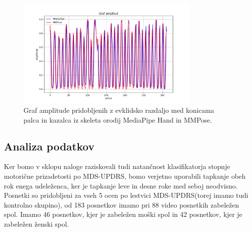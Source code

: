 \documentclass[a4paper,12pt]{article}  %
\begin{document}
\begin{figure}[H]
  \centering
  \includegraphics[width=0.8\textwidth]{slike/distances_plot_both.png}  
  \caption{Graf amplitude pridobljenih z evklidsko razdaljo med konicama palca in kazalca iz skeleta orodij MediaPipe Hand in MMPose.}
  \label{fig:amplituda_oba}
\end{figure}


\subsection{Analiza podatkov}

Ker bomo v sklopu naloge raziskovali tudi natančnost klasifikatorja stopnje motorične prizadetosti po MDS-UPDRS, 
bomo verjetno uporabili tapkanje obeh rok enega udeleženca, ker je tapkanje leve in desne roke med seboj neodvisno.\\

Posnetki so pridobljeni za vseh 5 ocen po lestvici MDS-UPDRS(torej imamo tudi kontrolno skupino), od 183 posnetkov 
imamo pri 88 video posnetkih zabeležen spol. Imamo 46 posnetkov, kjer je zabeležen moški spol in 42 posnetkov, kjer
je zabeležen ženski spol.
\end{document}
